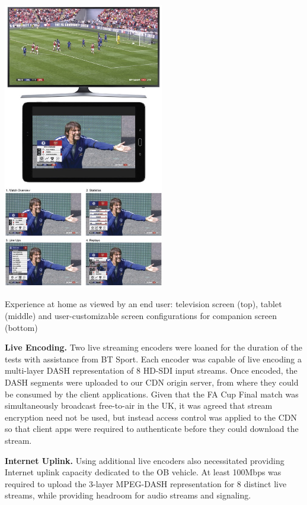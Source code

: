 \documentclass[sigchi-a]{acmart}
\begin{document}
\begin{marginfigure}
\hspace*{-0.5cm}
    \includegraphics[width=7cm]{Figures/footballathome1.jpg}
    \caption{Experience at home as viewed by an end user: television screen (top), tablet (middle) and user-customizable screen configurations for companion screen (bottom)}
    \label{fig:homeexperience}
\end{marginfigure}

\vspace{5pt}\noindent\textbf{Live Encoding.} Two live streaming encoders were loaned for the duration
of the tests with assistance from BT Sport. Each encoder was capable of live
encoding a multi-layer DASH representation of 8 HD-SDI input streams. Once
encoded, the DASH segments were uploaded to our CDN origin server, from where
they could be consumed by the client applications. Given that the FA Cup Final
match was simultaneously broadcast free-to-air in the UK, it was agreed that
stream encryption need not be used, but instead access control was applied to
the CDN so that client apps were required to authenticate before they
could download the stream.

\vspace{5pt}\noindent\textbf{Internet Uplink.} Using additional live encoders
also necessitated providing Internet uplink capacity dedicated to the OB vehicle.
At least 100Mbps was required to upload the 3-layer MPEG-DASH representation for
8 distinct live streams, while providing headroom for audio streams and signaling.
\end{document}
